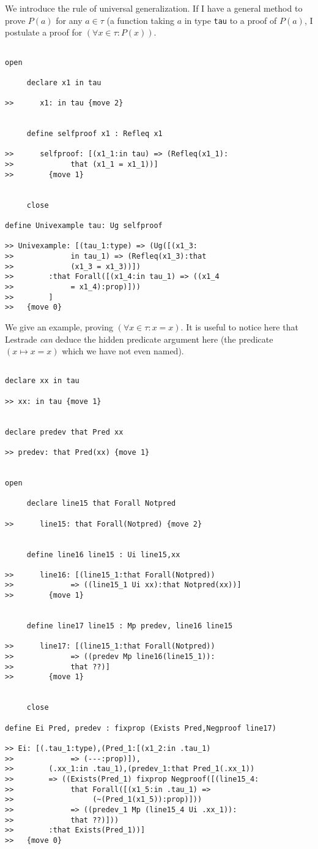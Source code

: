 \documentclass[12pt]{article}
\begin{document}
We introduce the rule of universal generalization.  If I have a general method to prove $P(a)$ for any $a\in \tau$ (a function taking $a$ in type {\tt tau} to a proof of $P(a)$,
I postulate a proof for $(\forall x\in \tau:P(x))$.

\begin{verbatim}

open

     declare x1 in tau

>>      x1: in tau {move 2}


     define selfproof x1 : Refleq x1

>>      selfproof: [(x1_1:in tau) => (Refleq(x1_1):
>>             that (x1_1 = x1_1))]
>>        {move 1}


     close

define Univexample tau: Ug selfproof

>> Univexample: [(tau_1:type) => (Ug([(x1_3:
>>             in tau_1) => (Refleq(x1_3):that 
>>             (x1_3 = x1_3))])
>>        :that Forall([(x1_4:in tau_1) => ((x1_4 
>>             = x1_4):prop)]))
>>        ]
>>   {move 0}

\end{verbatim}

We give an example, proving $(\forall x \in \tau:x=x)$.  It is useful to notice here that Lestrade {\em can\/} deduce the hidden predicate argument here (the predicate $(x \mapsto x=x)$ which we have not even named).

\begin{verbatim}

declare xx in tau

>> xx: in tau {move 1}


declare predev that Pred xx

>> predev: that Pred(xx) {move 1}


open

     declare line15 that Forall Notpred

>>      line15: that Forall(Notpred) {move 2}


     define line16 line15 : Ui line15,xx

>>      line16: [(line15_1:that Forall(Notpred)) 
>>             => ((line15_1 Ui xx):that Notpred(xx))]
>>        {move 1}


     define line17 line15 : Mp predev, line16 line15

>>      line17: [(line15_1:that Forall(Notpred)) 
>>             => ((predev Mp line16(line15_1)):
>>             that ??)]
>>        {move 1}


     close

define Ei Pred, predev : fixprop (Exists Pred,Negproof line17)

>> Ei: [(.tau_1:type),(Pred_1:[(x1_2:in .tau_1) 
>>             => (---:prop)]),
>>        (.xx_1:in .tau_1),(predev_1:that Pred_1(.xx_1)) 
>>        => ((Exists(Pred_1) fixprop Negproof([(line15_4:
>>             that Forall([(x1_5:in .tau_1) => 
>>                  (~(Pred_1(x1_5)):prop)]))
>>             => ((predev_1 Mp (line15_4 Ui .xx_1)):
>>             that ??)]))
>>        :that Exists(Pred_1))]
>>   {move 0}


\end{verbatim}
\end{document}
